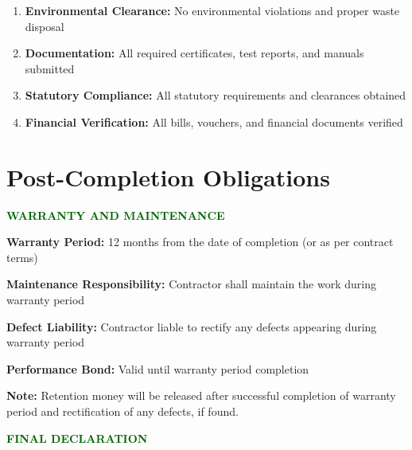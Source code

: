 \documentclass[12pt,a4paper]{article}
\newcommand{\checkbox}{\makebox[1em]{$\boxtimes$}}
\begin{document}
\begin{center}
{\begin{minipage}{0.95\textwidth}
\begin{center}
{\begin{minipage}{0.9\textwidth}
\begin{enumerate}[leftmargin=1cm]
\item \checkbox \textbf{Environmental Clearance:} No environmental violations and proper waste disposal

\item \checkbox \textbf{Documentation:} All required certificates, test reports, and manuals submitted

\item \checkbox \textbf{Statutory Compliance:} All statutory requirements and clearances obtained

\item \checkbox \textbf{Financial Verification:} All bills, vouchers, and financial documents verified
\end{enumerate}
\end{minipage}}
\end{center}

\vspace{1cm}
\section*{Post-Completion Obligations}

\begin{center}
\colorbox{certgold!20}{\begin{minipage}{0.9\textwidth}
\begin{center}
\textbf{\textcolor{darkgreen}{WARRANTY AND MAINTENANCE}}
\end{center}

\vspace{0.3cm}
\textbf{Warranty Period:} 12 months from the date of completion (or as per contract terms)

\textbf{Maintenance Responsibility:} Contractor shall maintain the work during warranty period

\textbf{Defect Liability:} Contractor liable to rectify any defects appearing during warranty period

\textbf{Performance Bond:} Valid until warranty period completion

\vspace{0.3cm}
\small\textbf{Note:} Retention money will be released after successful completion of warranty period and rectification of any defects, if found.
\end{minipage}}
\end{center}

\vspace{1cm}
\begin{center}
\colorbox{finalgreen!30}{\begin{minipage}{0.8\textwidth}
\begin{center}
\textbf{\Large\textcolor{darkgreen}{FINAL DECLARATION}}


\end{center}
\end{minipage}}
\end{center}
\end{minipage}}
\end{center}
\end{document}
